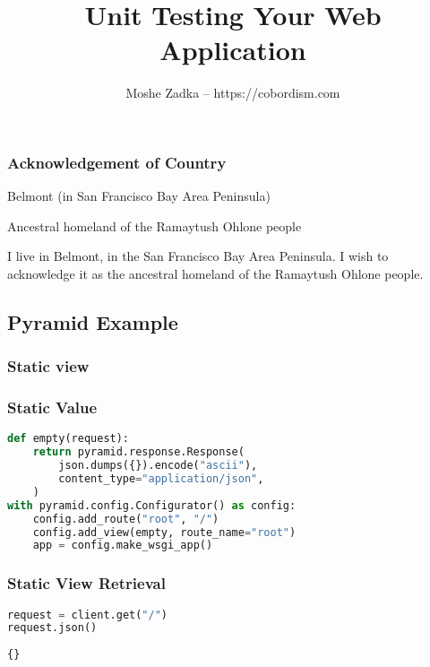 \documentclass{article}
\title{Unit Testing Your Web Application}
\author{Moshe Zadka -- https://cobordism.com}
\date{}
\begin{document}
\begin{titlepage}
\maketitle
\end{titlepage}

\frame{\titlepage}

\begin{frame}
\frametitle{Acknowledgement of Country}

Belmont (in San Francisco Bay Area Peninsula)

Ancestral homeland of the Ramaytush Ohlone people

\end{frame}

I live in Belmont, in the San Francisco Bay Area Peninsula. I wish to
acknowledge it as the ancestral homeland of the Ramaytush Ohlone people.

\hypertarget{pyramid-example}{%
\subsection{Pyramid Example}\label{pyramid-example}}

\hypertarget{static-view}{%
\subsubsection{Static view}\label{static-view}}

\begin{frame}[fragile]
\frametitle{Static Value}

\begin{lstlisting}[language=Python]
def empty(request):
    return pyramid.response.Response(
        json.dumps({}).encode("ascii"),
        content_type="application/json",
    )
with pyramid.config.Configurator() as config:
    config.add_route("root", "/")
    config.add_view(empty, route_name="root")
    app = config.make_wsgi_app()
\end{lstlisting}

\end{frame}

\begin{frame}[fragile]
\frametitle{Static View Retrieval}

\begin{lstlisting}[language=Python]
request = client.get("/")
request.json()
\end{lstlisting}

\begin{lstlisting}
{}
\end{lstlisting}

\end{frame}
\end{document}
